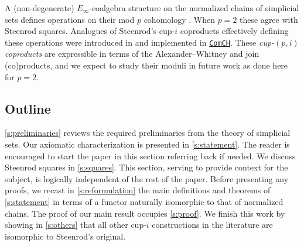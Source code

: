 A (non-degenerate) $E_\infty$-coalgebra structure on the normalized chains of simplicial sets defines operations on their mod $p$ cohomology \cite{steenrod1953cyclic, may1970general}.
When $p = 2$ these agree with Steenrod squares.
Analogues of Steenrod's \mbox{cup-$i$} coproducts effectively defining these operations were introduced in \cite{medina2021may_st} and implemented in \href{https://github.com/ammedmar/comch}{\texttt{ComCH}}.
These \textit{cup-$(p,i)$ coproducts} are expressible in terms of the Alexander--Whitney and join (co)products, and we expect to study their moduli in future work as done here for $p=2$.

\subsection*{Outline}

\cref{s:preliminaries} reviews the required preliminaries from the theory of simplicial sets.
Our axiomatic characterization is presented in \cref{s:statement}.
The reader is encouraged to start the paper in this section referring back if needed.
We discuss Steenrod squares in \cref{s:squares}.
This section, serving to provide context for the subject, is logically independent of the rest of the paper.
Before presenting any proofs, we recast in \cref{s:reformulation} the main definitions and theorems of \cref{s:statement} in terms of a functor naturally isomorphic to that of normalized chains.
The proof of our main result occupies \cref{s:proof}.
We finish this work by showing in \cref{s:others} that all other \mbox{cup-$i$} constructions in the literature are isomorphic to Steenrod's original.

